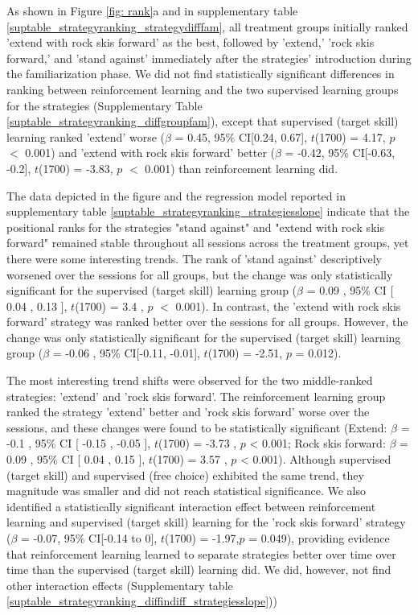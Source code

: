 \documentclass[pdflatex,sn-mathphys-num]{sn-jnl}%
\theoremstyle{thmstyleone}%
\theoremstyle{thmstyletwo}%
\theoremstyle{thmstylethree}%
\begin{document}
As shown in Figure \ref{fig: rank}a and in supplementary table \ref{suptable_strategyranking_strategydifffam}, all treatment groups initially ranked 'extend with rock skis forward' as the best, followed by 'extend,' 'rock skis forward,' and 'stand against' immediately after the strategies' introduction during the familiarization phase. We did not find statistically significant differences in ranking between reinforcement learning and the two supervised learning groups for the strategies (Supplementary Table \ref{suptable_strategyranking_diffgroupfam}), except that supervised (target skill) learning ranked 'extend' worse ($\beta$ = 0.45, 95\% CI[0.24,  0.67], $t$(1700) = 4.17, $p$ $<$ 0.001) and 'extend with rock skis forward' better  ($\beta$ = -0.42, 95\% CI[-0.63, -0.2], $t$(1700) = -3.83, $p$ $<$ 0.001) than reinforcement learning did.

The data depicted in the figure and the regression model reported in supplementary table \ref{suptable_strategyranking_strategiesslope} indicate that the positional ranks for the strategies "stand against" and "extend with rock skis forward" remained stable throughout all sessions across the treatment groups, yet there were some interesting trends. The rank of 'stand against' descriptively worsened over the sessions for all groups, but the change was only statistically significant for the supervised (target skill) learning group  ($\beta$ = 0.09 , 95\% CI [ 0.04 ,  0.13 ], $t$(1700) = 3.4 , $p$  $<$  0.001). In contrast, the 'extend with rock skis forward' strategy was ranked better over the sessions for all groups. However, the change was only statistically significant for the supervised (target skill) learning group ($\beta$ = -0.06 , 95\% CI[-0.11, -0.01], $t$(1700) = -2.51, $p$ = 0.012). 

The most interesting trend shifts were observed for the two middle-ranked strategies: 'extend' and 'rock skis forward'. The reinforcement learning group ranked the strategy 'extend' better and 'rock skis forward' worse over the sessions, and these changes were found to be statistically significant (Extend: $\beta$ = -0.1 , 95\% CI [ -0.15 ,  -0.05 ], $t$(1700) = -3.73 , $p$  <  0.001; Rock skis forward:  $\beta$ = 0.09 , 95\% CI [ 0.04 ,  0.15 ], $t$(1700) = 3.57 , $p$  <  0.001). Although supervised (target skill) and supervised (free choice) exhibited the same trend, they magnitude was smaller and did not reach statistical significance. We also identified a statistically significant interaction effect between reinforcement learning and supervised (target skill) learning for the 'rock skis forward' strategy ($\beta$ = -0.07, 95\% CI[-0.14 to 0], $t$(1700) = -1.97,$p$ = 0.049), providing evidence that reinforcement learning learned to separate strategies better over time over time than the supervised (target skill) learning did. We did, however, not find other interaction effects (Supplementary table \ref{suptable_strategyranking_diffindiff_strategiesslope})) 
\end{document}
